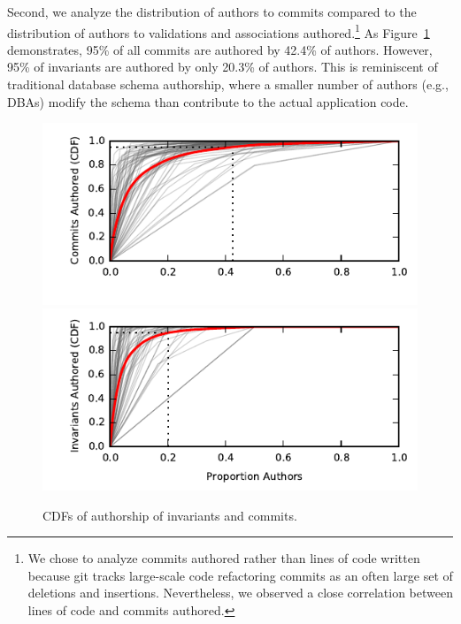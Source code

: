 Second, we analyze the distribution of authors to commits compared to
the distribution of authors to validations and associations
authored.\footnote{We chose to analyze commits authored rather than
  lines of code written because git tracks large-scale code
  refactoring commits as an often large set of deletions and
  insertions. Nevertheless, we observed a close correlation between
  lines of code and commits authored.} As Figure~\ref{fig:cdfs}
demonstrates, 95\% of all commits are authored by 42.4\% of
authors. However, 95\% of invariants are authored by only 20.3\% of
authors. This is reminiscent of traditional database schema
authorship, where a smaller number of authors (e.g., DBAs) modify the
schema than contribute to the actual application code.

\begin{figure}
  \newcommand{\skipht}{\\[-2em]}
\includegraphics[width=\columnwidth]{figs/commit-authorship-cdf.pdf}\vspace{-2em}
\includegraphics[width=\columnwidth]{figs/invariant-authorship-cdf.pdf}\vspace{-1em}
\caption{CDFs of authorship of invariants and commits.}
\label{fig:cdfs}
\end{figure}

